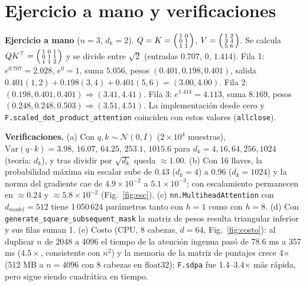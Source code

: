 \documentclass[10pt,letterpaper]{article}
\newcommand{\dk}{d_k}
\begin{document}
\section{Ejercicio a mano y verificaciones}\label{sec:verif}
\textbf{Ejercicio a mano} ($n=3$, $\dk=2$). $Q=K=\begin{psmallmatrix}1&0\\0&1\\1&1\end{psmallmatrix}$, $V=\begin{psmallmatrix}1&2\\3&4\\5&6\end{psmallmatrix}$. Se calcula $QK^\top=\begin{psmallmatrix}1&0&1\\0&1&1\\1&1&2\end{psmallmatrix}$ y se divide entre $\sqrt2$ (entradas $0.707$, $0$, $1.414$). Fila 1: $e^{0.707}=2.028$, $e^0=1$, suma $5.056$, pesos $(0.401,0.198,0.401)$, salida $0.401(1,2)+0.198(3,4)+0.401(5,6)=(3.00,4.00)$. Fila 2: $(0.198,0.401,0.401)\Rightarrow(3.41,4.41)$. Fila 3: $e^{1.414}=4.113$, suma $8.169$, pesos $(0.248,0.248,0.503)\Rightarrow(3.51,4.51)$. La implementación desde cero y \texttt{F.scaled\_dot\_product\_attention} coinciden con estos valores (\texttt{allclose}).

\textbf{Verificaciones.} (a) Con $q,k\sim\mathcal N(0,I)$ ($2\times10^4$ muestras), $\mathrm{Var}(q\cdot k)=3.98,\,16.07,\,64.25,\,253.1,\,1015.6$ para $\dk=4,16,64,256,1024$ (teoría: $\dk$), y tras dividir por $\sqrt{\dk}$ queda $\approx1.00$. (b) Con 16 llaves, la probabilidad máxima sin escalar sube de $0.43$ ($\dk=4$) a $0.96$ ($\dk=1024$) y la norma del gradiente cae de $4.9\!\times\!10^{-2}$ a $5.1\!\times\!10^{-3}$; con escalamiento permanecen en $\approx0.24$ y $\approx5.8\!\times\!10^{-2}$ (Fig.~\ref{fig:esc}). (c) \texttt{nn.MultiheadAttention} con $d_{model}=512$ tiene 1\,050\,624 parámetros tanto con $h=1$ como con $h=8$. (d) Con \texttt{generate\_square\_subsequent\_mask} la matriz de pesos resulta triangular inferior y sus filas suman 1. (e) Costo (CPU, 8 cabezas, $d=64$, Fig.~\ref{fig:costo}): al duplicar $n$ de 2048 a 4096 el tiempo de la atención ingenua pasó de 78.6 ms a 357 ms ($4.5\times$, consistente con $n^2$) y la memoria de la matriz de puntajes crece 4$\times$ (512 MB a $n=4096$ con 8 cabezas en float32); \texttt{F.sdpa} fue 1.4--3.4$\times$ más rápida, pero sigue siendo cuadrática en tiempo.
\end{document}
